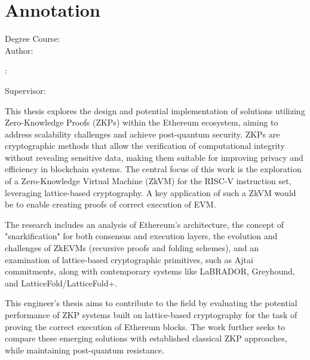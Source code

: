 \newpage{}\thispagestyle{empty}\medskip{}

\thispagestyle{empty}

\vspace*{\fill}

\section*{Annotation}

\begin{minipage}[t]{1\columnwidth}
    \FIITuniversity

    \FIITfaculty

    Degree Course: \FIITstudyProgram\\

    Author: \FIITauthor

    \FIITthesis: \FIITtitle

    Supervisor: \FIITsupervisor

    \FIITdate
\end{minipage}

\bigskip{}

This thesis explores the design and potential implementation of
solutions utilizing Zero-Knowledge Proofs (ZKPs) within the Ethereum
ecosystem, aiming to address scalability challenges and achieve post-quantum
security. ZKPs are cryptographic methods that allow the verification of
computational integrity without revealing sensitive data, making them
suitable for improving privacy and efficiency in blockchain systems. The
central focus of this work is the exploration of a Zero-Knowledge Virtual
Machine (ZkVM) for the RISC-V instruction set, leveraging lattice-based
cryptography. A key application of such a ZkVM would be to enable creating
proofs of correct execution of EVM.

The research includes an analysis of Ethereum's architecture, the concept of
"snarkification" for both consensus and execution layers, the evolution and
challenges of ZkEVMs (recursive proofs and folding schemes), and an
examination of lattice-based cryptographic primitives, such as Ajtai
commitments, along with contemporary systems like LaBRADOR, Greyhound, and
LatticeFold/LatticeFold+.

This engineer's thesis aims to contribute to the field by evaluating the
potential performance of ZKP systems built on lattice-based cryptography for
the task of proving the correct execution of Ethereum blocks. The work further
seeks to compare these emerging solutions with established classical ZKP
approaches, while maintaining post-quantum resistance.

\newpage{}\thispagestyle{empty}

\emptypage
